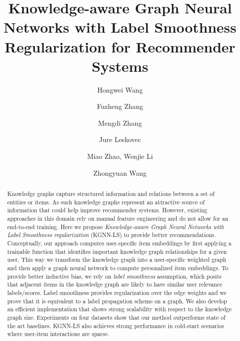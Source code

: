 \documentclass[sigconf]{acmart}
\begin{document}
 
\title{Knowledge-aware Graph Neural Networks with Label Smoothness Regularization for Recommender Systems}



\author{Hongwei Wang}

\author{Fuzheng Zhang}

\author{Mengdi Zhang}

\author{Jure Leskovec}

\author{Miao Zhao, Wenjie Li}

\author{Zhongyuan Wang}


\begin{abstract}
	Knowledge graphs capture structured information and relations between a set of entities or items.
	As such knowledge graphs represent an attractive source of information that could help improve recommender systems.
	However, existing approaches in this domain rely on manual feature engineering and do not allow for an end-to-end training.
	Here we propose \textit{Knowledge-aware Graph Neural Networks with Label Smoothness regularization} (KGNN-LS) to provide better recommendations.
	Conceptually, our approach computes user-specific item embeddings by first applying a trainable function that identifies important knowledge graph relationships for a given user. 
	This way we transform the knowledge graph into a user-specific weighted graph and then apply a graph neural network to compute personalized item embeddings.
	To provide better inductive bias, we rely on \textit{label smoothness} assumption, which posits that adjacent items in the knowledge graph are likely to have similar user relevance labels/scores.
	Label smoothness provides regularization over the edge weights and we prove that it is equivalent to a label propagation scheme on a graph.
	We also develop an efficient implementation that shows strong scalability with respect to the knowledge graph size.
	Experiments on four datasets show that our method outperforms state of the art baselines.
	KGNN-LS also achieves strong performance in cold-start scenarios where user-item interactions are sparse.
\end{abstract}
\end{document}
